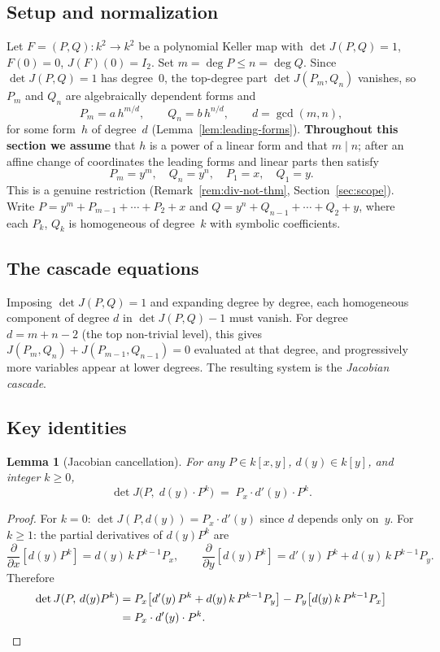 \documentclass[12pt,a4paper]{article}
\newtheorem{lemma}[theorem]{Lemma}
\theoremstyle{definition}
\newcommand{\kk}{k}
\begin{document}
\subsection{Setup and normalization}

Let $F = (P,Q) \colon \kk^2 \to \kk^2$ be a polynomial Keller map with
$\det J(P,Q) = 1$, $F(0) = 0$, $J(F)(0) = I_2$. Set $m = \deg P \leq n = \deg Q$.
Since $\det J(P,Q) = 1$ has degree~$0$, the top-degree part
$\det J(P_m, Q_n)$ vanishes, so $P_m$ and $Q_n$ are algebraically
dependent forms and
\[
  P_m = a\,h^{m/d}, \qquad Q_n = b\,h^{n/d}, \qquad d = \gcd(m,n),
\]
for some form~$h$ of degree~$d$ (Lemma~\ref{lem:leading-forms}).
\textbf{Throughout this section we assume} that $h$ is a power of a
linear form and that $m \mid n$; after an affine change of coordinates
the leading forms and linear parts then satisfy
\[
  P_m = y^m, \quad Q_n = y^n, \quad P_1 = x, \quad Q_1 = y.
\]
This is a genuine restriction (Remark~\ref{rem:div-not-thm},
Section~\ref{sec:scope}).
Write $P = y^m + P_{m-1} + \cdots + P_2 + x$ and $Q = y^n + Q_{n-1} + \cdots + Q_2 + y$,
where each $P_k$, $Q_k$ is homogeneous of degree~$k$ with symbolic coefficients.

\subsection{The cascade equations}

Imposing $\det J(P,Q) = 1$ and expanding degree by degree, each homogeneous
component of degree $d$ in $\det J(P,Q) - 1$ must vanish. For degree $d = m+n-2$
(the top non-trivial level), this gives $J(P_m, Q_n) + J(P_{m-1}, Q_{n-1}) = 0$
evaluated at that degree, and progressively more variables appear at lower degrees.
The resulting system is the \emph{Jacobian cascade}.

\subsection{Key identities}

\begin{lemma}[Jacobian cancellation]\label{lem:jac-cancel}
For any $P \in \kk[x,y]$, $d(y) \in \kk[y]$, and integer $k \geq 0$,
\[
  \det J\bigl(P,\; d(y) \cdot P^k\bigr) \;=\; P_x \cdot d'(y) \cdot P^k.
\]
\end{lemma}

\begin{proof}
For $k = 0$: $\det J(P, d(y)) = P_x \cdot d'(y)$ since $d$ depends only on~$y$.
For $k \geq 1$: the partial derivatives of $d(y) P^k$ are
\[
  \frac{\partial}{\partial x}[d(y) P^k] = d(y)\, k\, P^{k-1} P_x, \qquad
  \frac{\partial}{\partial y}[d(y) P^k] = d'(y)\, P^k + d(y)\, k\, P^{k-1} P_y.
\]
Therefore
\begin{align*}
  \det J(P,\, d(y)P^k) &= P_x\bigl[d'(y)\,P^k + d(y)\,k\,P^{k-1}P_y\bigr]
    - P_y\bigl[d(y)\,k\,P^{k-1}P_x\bigr] \\
  &= P_x \cdot d'(y) \cdot P^k. \qedhere
\end{align*}
\end{proof}
\end{document}
